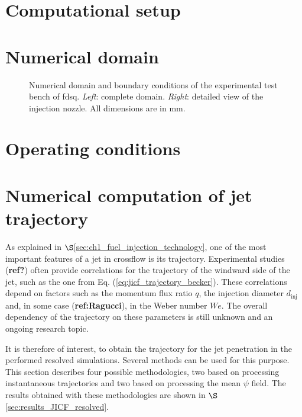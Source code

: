 \section{Computational setup}


\section*{Numerical domain}


\begin{figure}[ht]
     \centering
      \caption{Numerical domain and boundary conditions of the experimental test bench of fdsq. \textsl{Left}: complete domain. \textsl{Right}: detailed view of the injection nozzle. All dimensions are in mm.}
      \label{fig:numerical_setup_maquette_JICF_DLR}
\end{figure}

\section*{Operating conditions}


\section{Numerical computation of jet trajectory}

As explained in $\S$\ref{sec:ch1_fuel_injection_technology}, one of the most important features of a jet in crossflow is its trajectory. Experimental studies (\textbf{ref?}) often provide correlations for the trajectory of the windward side of the jet, such as the one from Eq. (\ref{eq:jicf_trajectory_becker}). These correlations depend on factors such as the momentum flux ratio $q$, the injection diameter $d_\mathrm{inj}$ and, in some case (\textbf{ref:Ragucci}), in the Weber number $We$. The overall dependency of the trajectory on these parameters is still unknown and an ongoing research topic.

It is therefore of interest, to obtain the trajectory for the jet penetration in the performed resolved simulations. Several methods can be used for this purpose. This section describes four possible methodologies, two based on processing instantaneous trajectories and two based on processing the mean $\psi$ field. The results obtained with these methodologies are shown in $\S$\ref{sec:results_JICF_resolved}.


